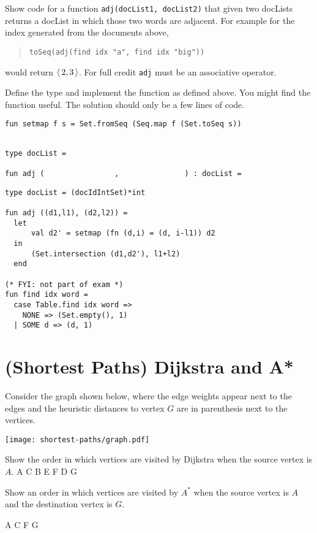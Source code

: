 \begin{problem}%

Show code for a function \texttt{adj(docList1, docList2)} that given
two docLists returns a docList in which those two words
are adjacent.  For example for the index generated from the documents
above, 
\begin{quote}
\texttt{toSeq(adj(find idx "a", find idx "big"))} 
\end{quote}
would return
$\left\langle\, {2, 3} \,\right\rangle$.  For full credit \texttt{adj} must be an associative operator.

\ask
Define the  type and implement the function  as defined above.
You might find the function  useful. The solution should
only be a few lines of code.
\begin{lstlisting}[numbers=none]
fun setmap f s = Set.fromSeq (Seq.map f (Set.toSeq s)) 
\end{lstlisting}


\begin{lstlisting}[numbers=none]

type docList = 

fun adj (                ,               ) : docList =

\end{lstlisting}


\sol
\begin{lstlisting}[numbers=none]
type docList = (docIdIntSet)*int

fun adj ((d1,l1), (d2,l2)) = 
  let 
      val d2' = setmap (fn (d,i) = (d, i-l1)) d2
  in  
      (Set.intersection (d1,d2'), l1+l2)
  end

(* FYI: not part of exam *)
fun find idx word = 
  case Table.find idx word =>
    NONE => (Set.empty(), 1)
  | SOME d => (d, 1)
\end{lstlisting}
   
\end{problem}



\section{(Shortest Paths) Dijkstra and A*}
%


\begin{problem}[6.]

Consider the graph shown below, where the edge weights appear next to
the edges and the heuristic distances to vertex $G$ are in parenthesis
next to the vertices.
\begin{center}
  \texttt{[image: shortest-paths/graph.pdf]}
\end{center}

\ask
Show the order in which vertices are visited by Dijkstra when the source
vertex is $A$.
\sol
A C B E F D G


\ask Show an order in which vertices are visited by $A^*$ when
the source vertex is $A$ and the destination vertex is $G$.

\sol
A C F G 

\end{problem}

